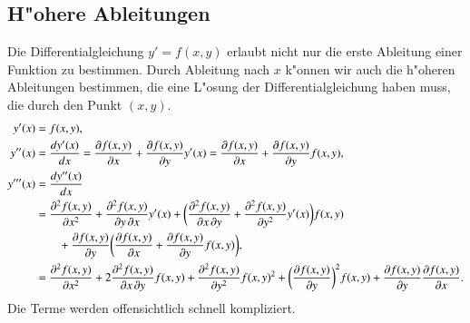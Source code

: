\subsection{H"ohere Ableitungen\label{grundlagen:hoehere-ableitungen}}
%
Die Differentialgleichung $y'=f(x,y)$ erlaubt nicht nur die erste
Ableitung einer Funktion zu bestimmen.
Durch Ableitung nach $x$ k"onnen wir auch die h"oheren Ableitungen
bestimmen, die eine L"osung der Differentialgleichung haben muss,
die durch den Punkt $(x,y)$.
\begin{align}
y'(x)
&=
f(x,y),
\notag
\\
y''(x)
&=
\frac{dy'(x)}{dx}
=
\frac{\partial f(x,y)}{\partial x} + \frac{\partial f(x,y)}{\partial y}y'(x)
=
\frac{\partial f(x,y)}{\partial x} + \frac{\partial f(x,y)}{\partial y}f(x,y),
\label{grundlagen:2abl}
\\
y'''(x)
&=
\frac{dy''(x)}{dx}
\notag
\\
&=
\frac{\partial^2 f(x,y)}{\partial x^2}
+ \frac{\partial^2 f(x,y)}{\partial y\,\partial x}y'(x)
+ \biggl(\frac{\partial^2 f(x,y)}{\partial x\,\partial y}
+ \frac{\partial^2 f(x,y)}{\partial y^2}y'(x)\biggr)f(x,y)
\notag
\\
&\qquad
+ \frac{\partial f(x,y)}{\partial y}\biggl(
\frac{\partial f(x,y)}{\partial x} + \frac{\partial f(x,y)}{\partial y}f(x,y)
\biggr),
\notag
\\
&=
\frac{\partial^2 f(x,y)}{\partial x^2}
+ 2\frac{\partial^2 f(x,y)}{\partial x\,\partial y}f(x,y)
+ \frac{\partial^2 f(x,y)}{\partial y^2}f(x,y)^2
+ \biggl(\frac{\partial f(x,y)}{\partial y}\biggr)^2 f(x,y)
+ \frac{\partial f(x,y)}{\partial y} \frac{\partial f(x,y)}{\partial x}.
\label{grundlagen:3abl}
\end{align}
Die Terme werden offensichtlich schnell kompliziert.

